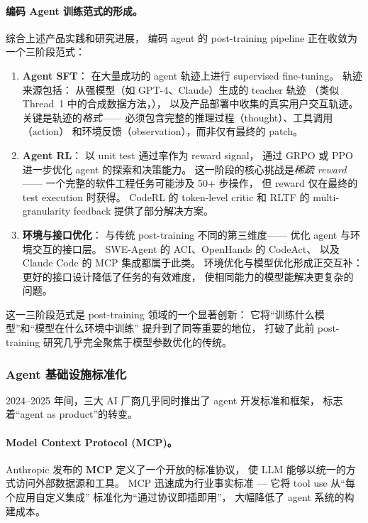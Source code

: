 \paragraph{编码 Agent 训练范式的形成。}
综合上述产品实践和研究进展，
编码 agent 的 post-training pipeline 正在收敛为一个三阶段范式：

\begin{enumerate}[leftmargin=*]
  \item \textbf{Agent SFT}：
    在大量成功的 agent 轨迹上进行 supervised fine-tuning。
    轨迹来源包括：
    从强模型（如 GPT-4、Claude）生成的 teacher 轨迹
    （类似 Thread~1 中的合成数据方法，），
    以及产品部署中收集的真实用户交互轨迹。
    关键是轨迹的\emph{格式}——
    必须包含完整的推理过程（thought）、工具调用（action）
    和环境反馈（observation），而非仅有最终的 patch。
  \item \textbf{Agent RL}：
    以 unit test 通过率作为 reward signal，
    通过 GRPO 或 PPO 进一步优化 agent 的探索和决策能力。
    这一阶段的核心挑战是\emph{稀疏 reward}——
    一个完整的软件工程任务可能涉及 50+ 步操作，
    但 reward 仅在最终的 test execution 时获得。
    CodeRL 的 token-level critic 和 RLTF 的 multi-granularity feedback
    提供了部分解决方案。
  \item \textbf{环境与接口优化}：
    与传统 post-training 不同的第三维度——
    优化 agent 与环境交互的接口层。
    SWE-Agent 的 ACI、OpenHands 的 CodeAct、
    以及 Claude Code 的 MCP 集成都属于此类。
    环境优化与模型优化形成正交互补：
    更好的接口设计降低了任务的有效难度，
    使相同能力的模型能解决更复杂的问题。
\end{enumerate}

这一三阶段范式是 post-training 领域的一个显著创新：
它将``训练什么模型''和``模型在什么环境中训练''
提升到了同等重要的地位，
打破了此前 post-training 研究几乎完全聚焦于模型参数优化的传统。

\subsubsection{Agent 基础设施标准化}

2024--2025 年间，三大 AI 厂商几乎同时推出了 agent 开发标准和框架，
标志着``agent as product''的转变。

\paragraph{Model Context Protocol (MCP)。}
Anthropic 发布的 \textbf{MCP} \cite{anthropic2024mcp}
定义了一个开放的标准协议，
使 LLM 能够以统一的方式访问外部数据源和工具。
MCP 迅速成为行业事实标准 ---
它将 tool use 从``每个应用自定义集成''
标准化为``通过协议即插即用''，
大幅降低了 agent 系统的构建成本。

